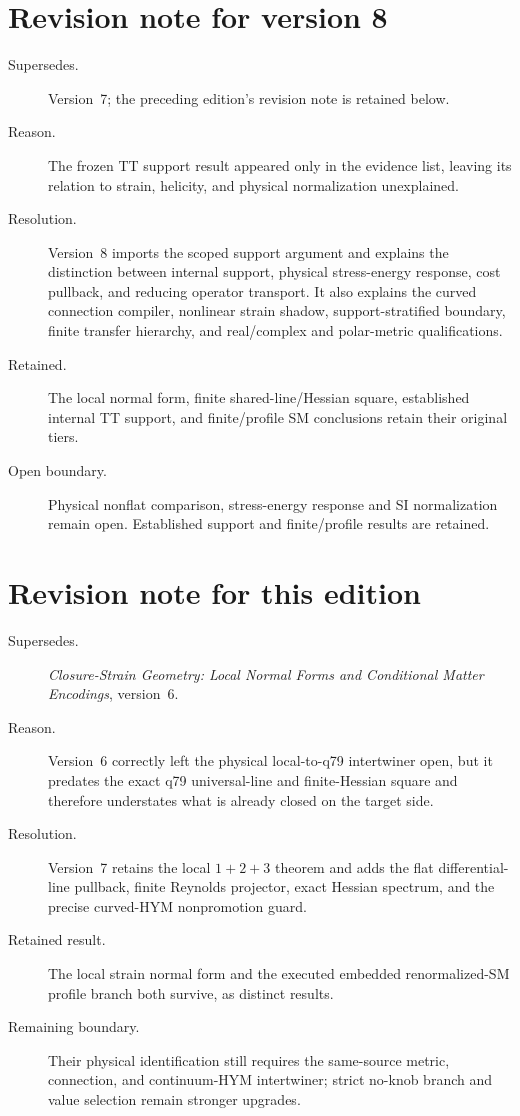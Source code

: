 \documentclass[11pt]{article}
\begin{document}
\section*{Revision note for version 8}
\begin{description}
\item[Supersedes.] Version~7; the preceding edition's revision note is retained
below.
\item[Reason.] The frozen TT support result appeared only in the evidence
list, leaving its relation to strain, helicity, and physical normalization
unexplained.
\item[Resolution.] Version~8 imports the scoped support argument and explains
the distinction between internal support, physical stress-energy response,
cost pullback, and reducing operator transport. It also explains the curved
connection compiler, nonlinear strain shadow, support-stratified boundary,
finite transfer hierarchy, and real/complex and polar-metric qualifications.
\item[Retained.] The local normal form, finite shared-line/Hessian square,
established internal TT support, and finite/profile SM conclusions retain
their original tiers.
\item[Open boundary.] Physical nonflat comparison, stress-energy response and
SI normalization remain open. Established support and finite/profile results
are retained.
\end{description}

\section*{Revision note for this edition}
\begin{description}
\item[Supersedes.] \emph{Closure-Strain Geometry: Local Normal Forms and
Conditional Matter Encodings}, version~6.
\item[Reason.] Version~6 correctly left the physical local-to-q79 intertwiner
open, but it predates the exact q79 universal-line and finite-Hessian square
and therefore understates what is already closed on the target side.
\item[Resolution.] Version~7 retains the local $1+2+3$ theorem and adds the
flat differential-line pullback, finite Reynolds projector, exact Hessian
spectrum, and the precise curved-HYM nonpromotion guard.
\item[Retained result.] The local strain normal form and the executed embedded
renormalized-SM profile branch both survive, as distinct results.
\item[Remaining boundary.] Their physical identification still requires the
same-source metric, connection, and continuum-HYM intertwiner; strict no-knob
branch and value selection remain stronger upgrades.
\end{description}
\end{document}
